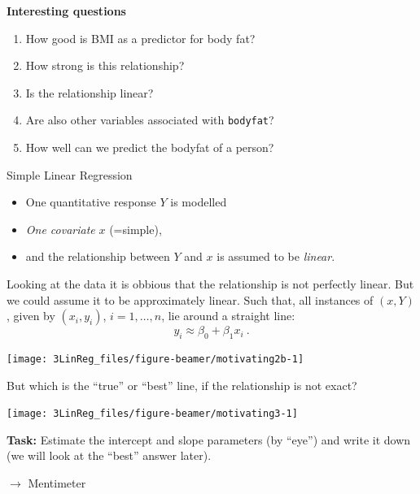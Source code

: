 \documentclass[
  10pt,
  ignorenonframetext,
]{beamer}
\providecommand{\tightlist}{%
  \setlength{\itemsep}{0pt}\setlength{\parskip}{0pt}}
\begin{document}
\begin{frame}[fragile]
\textbf{Interesting questions}

\begin{enumerate}
\tightlist
\item
  How good is BMI as a predictor for body fat?
\item
  How strong is this relationship?
\item
  Is the relationship linear?
\item
  Are also other variables associated with \texttt{bodyfat}?
\item
  How well can we predict the bodyfat of a person?
\end{enumerate}
\end{frame}

\begin{frame}{Simple Linear Regression}
\protect\hypertarget{simple-linear-regression}{}
\begin{itemize}
\item
  One quantitative response \(Y\) is modelled
\item
  \emph{One covariate} \(x\) (=simple),
\item
  and the relationship between \(Y\) and \(x\) is assumed to be
  \emph{linear}.
\end{itemize}
\end{frame}

\begin{frame}
Looking at the data it is obbious that the relationship is not perfectly
linear. But we could assume it to be approximately linear. Such that,
all instances of \((x,Y)\), given by \((x_i,y_i)\), \(i= 1,\ldots, n\),
lie around a straight line: \[y_i \approx \beta_0 + \beta_1 x_i\ .\]

\begin{center}\texttt{[image: 3LinReg\_files/figure-beamer/motivating2b-1]} \end{center}
\end{frame}

\begin{frame}
But which is the ``true'' or ``best'' line, if the relationship is not
exact?

\begin{center}\texttt{[image: 3LinReg\_files/figure-beamer/motivating3-1]} \end{center}

\textbf{Task:} Estimate the intercept and slope parameters (by ``eye'')
and write it down (we will look at the ``best'' answer later).

\(\rightarrow\) Mentimeter
\end{frame}
\end{document}
